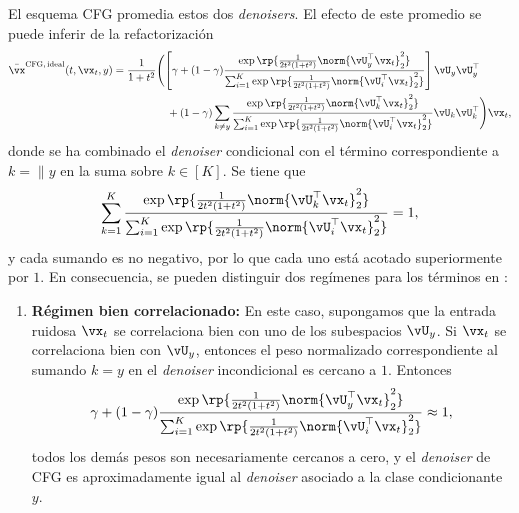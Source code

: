 \documentclass[../../book-main_es.tex]{subfiles}
\begin{document}
\begin{example}
    El esquema CFG promedia estos dos \textit{denoisers}.
    El efecto de este promedio se puede inferir de la refactorización
    \begin{equation}\label{eq:cfg-denoiser-mog-low-rank-2}
        \begin{split}
            \bar{\vx}^{\mathrm{CFG,\,ideal}}(t, \vx_t, y)
            =
            \frac{1}{1 + t^{2}}
            &\Biggl(
                \left[\gamma + (1 - \gamma)
                    \frac{\exp\rp{\frac{1}{2t^{2}(1
                    + t^{2})}\norm{\vU_{y}^{\top}\vx_t}_{2}^{2}}}{\sum_{i
                        = 1}^{K}\exp\rp{\frac{1}{2t^{2}(1
                    + t^{2})}\norm{\vU_{i}^{\top}\vx_t}_{2}^{2}}}
                \right]
                \vU_{y}\vU_{y}^{\top}
                \\
                &\quad+
                (1 - \gamma)
                \sum_{k \neq y}\frac{\exp\rp{\frac{1}{2t^{2}(1
                + t^{2})}\norm{\vU_{k}^{\top}\vx_t}_{2}^{2}}}{\sum_{i
                    = 1}^{K}\exp\rp{\frac{1}{2t^{2}(1
                                +
                t^{2})}\norm{\vU_{i}^{\top}\vx_t}_{2}^{2}}}\vU_{k}\vU_{k}^{\top}
            \Biggr)
            \vx_t,
        \end{split}
    \end{equation}
    donde se ha combinado el \textit{denoiser} condicional con el término correspondiente 
    a $k\!=\|y$ en la suma sobre $k \in [K]$. Se tiene que
    \begin{equation}
        \sum_{k=1}^K
        \frac{\exp\rp{\frac{1}{2t^{2}(1
        + t^{2})}\norm{\vU_{k}^{\top}\vx_t}_{2}^{2}}}{\sum_{i
            = 1}^{K}\exp\rp{\frac{1}{2t^{2}(1
        + t^{2})}\norm{\vU_{i}^{\top}\vx_t}_{2}^{2}}}
        = 1,
    \end{equation}
    y cada sumando es no negativo, por lo que cada uno está acotado superiormente por $1$.
    En consecuencia, se pueden distinguir dos regímenes para los términos en
    :
    \begin{enumerate}
        \item \textbf{Régimen bien correlacionado:} En este caso, supongamos que la entrada ruidosa
            $\vx_t$ se correlaciona bien con uno de los subespacios $\vU_y$.
            Si $\vx_t$ se correlaciona bien con
            $\vU_y$, entonces el peso normalizado correspondiente al
            sumando $k=y$ en el \textit{denoiser} incondicional es cercano a $1$.
            Entonces
            \begin{equation}
                \gamma + (1 - \gamma)
                \frac{\exp\rp{\frac{1}{2t^{2}(1
                + t^{2})}\norm{\vU_{y}^{\top}\vx_t}_{2}^{2}}}{\sum_{i
                    = 1}^{K}\exp\rp{\frac{1}{2t^{2}(1
                + t^{2})}\norm{\vU_{i}^{\top}\vx_t}_{2}^{2}}}
                \approx 1,
            \end{equation}
            todos los demás pesos son necesariamente cercanos a cero, y el \textit{denoiser} de CFG
            es aproximadamente igual al \textit{denoiser} asociado a la
            clase condicionante $y$.


\end{enumerate}
\end{example}
\end{document}
